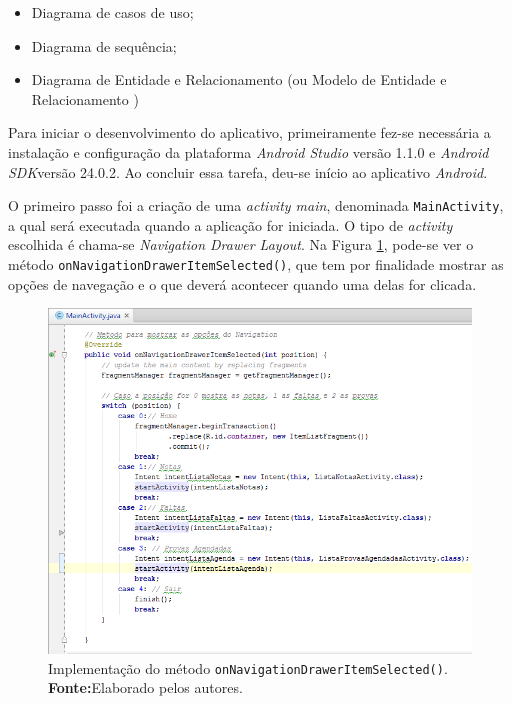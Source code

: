 	\begin{itemize}
	  \item Diagrama de casos de uso;
	  \item Diagrama de sequência;
	  \item Diagrama de Entidade e Relacionamento (ou Modelo de Entidade e
	  Relacionamento )	
	\end{itemize}
	
	
	\par Para iniciar o desenvolvimento do aplicativo, primeiramente fez-se
necessária a instalação e configuração da plataforma \textit{Android Studio}
versão 1.1.0 e \textit{Android SDK}versão 24.0.2. Ao concluir essa tarefa,
deu-se início ao aplicativo \textit{Android}.
	
	
	\par O primeiro passo foi a criação de uma \textit{activity main}, denominada
\texttt{MainActivity}, a qual será executada  quando a aplicação  for iniciada.
O tipo de \textit{activity} escolhida é chama-se \textit{Navigation Drawer
Layout}. Na Figura \ref{fig:qm2}, pode-se ver o método
\texttt{onNavigationDrawerItemSelected()}, que tem por finalidade mostrar as
opções de navegação e o que deverá acontecer quando uma delas for clicada. 
	
		\begin{figure}[h!]
			\centerline{\includegraphics[scale=0.5]{./imagens/2_q_metodologico/qm2.png}}
			\caption[Implementação do
			método \texttt{onNavigationDrawerItemSelected()}]{Implementação do
			método \texttt{onNavigationDrawerItemSelected()}.
			 \textbf{Fonte:}Elaborado pelos autores.}
			\label{fig:qm2}
		\end{figure}
		\pagebreak
	
